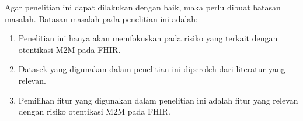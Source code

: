 Agar penelitian ini dapat dilakukan dengan baik, maka perlu dibuat batasan masalah. Batasan masalah pada penelitian ini adalah:

\begin{enumerate}
    \item Penelitian ini hanya akan memfokuskan pada risiko yang terkait dengan otentikasi M2M pada FHIR.
    \item Datasek yang digunakan dalam penelitian ini diperoleh dari literatur yang relevan.
    \item Pemilihan fitur yang digunakan dalam penelitian ini adalah fitur yang relevan dengan risiko otentikasi M2M pada FHIR.
\end{enumerate}